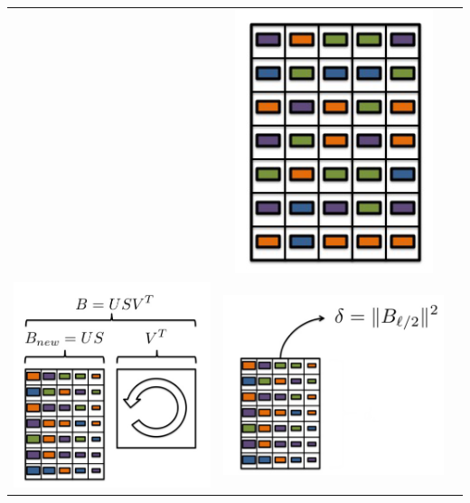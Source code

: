 \documentclass{beamer}
\begin{document}
\begin{frame}
\begin{center}
\begin{tabular}{ccc}
			&  \includegraphics*[scale=0.23]{figures/FD3.png}  \\
			\includegraphics*[scale=0.23]{figures/FD4.png}  
			& \includegraphics*[scale=0.23]{figures/FD5.png}  

\end{tabular}
\end{center}
\end{frame}
\end{document}
